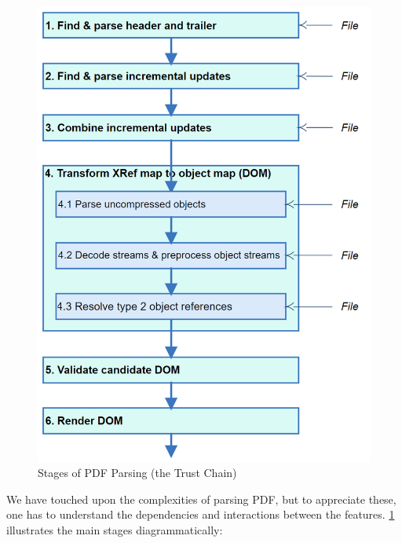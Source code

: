 \begin{figure}[t]
  \centering
  \includegraphics[width=0.8\linewidth]{figures/Stages.png}
  \caption{Stages of PDF Parsing (the Trust Chain)}
  \label{fig:pdf-trust-chain}
\end{figure}

We have touched upon the complexities of parsing
PDF, but to appreciate these, one has to understand the
dependencies and interactions between the features.
\cref{fig:pdf-trust-chain} illustrates the main stages diagrammatically:

